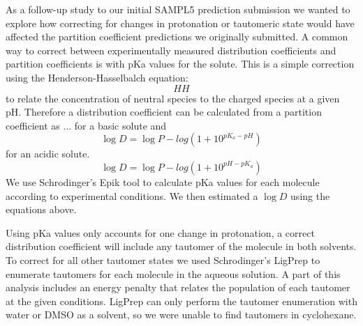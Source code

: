 As a follow-up study to our initial SAMPL5 prediction submission we wanted to explore how correcting for changes in protonation or tautomeric state would have affected the partition coefficient predictions we originally submitted. 
A common way to correct between experimentally measured distribution coefficients and partition coefficients is with pKa values for the solute. %
This is a simple correction using the Henderson-Hasselbalch %
equation:
\begin{equation}
HH
\label{HH}
\end{equation}
to relate the concentration of neutral species to the charged species at a given pH. 
Therefore a distribution coefficient can be calculated from a partition coefficient as ... 
for a basic solute and 
\begin{equation}
\log D = \log P - log(1+10^{pK_a-pH})
\label{basic}
\end{equation}
for an acidic solute. 
\begin{equation}
\log D = \log P - log(1+10^{pH-pK_a})
\label{acidic}
\end{equation}
We use Schrodinger's %
Epik tool to calculate pKa values for each molecule according to experimental conditions. 
We then estimated a $\log D$ using the equations above. 

Using pKa values only accounts for one change in protonation, a correct distribution coefficient will include any tautomer of the molecule in both solvents. 
To correct for all other tautomer states we used Schrodinger's LigPrep to enumerate tautomers for each molecule in the aqueous solution. 
A part of this analysis includes an energy penalty that relates the population of each tautomer at the given conditions.
LigPrep can only perform the tautomer enumeration with water or DMSO as a solvent, so we were unable to find tautomers in cyclohexane. 

